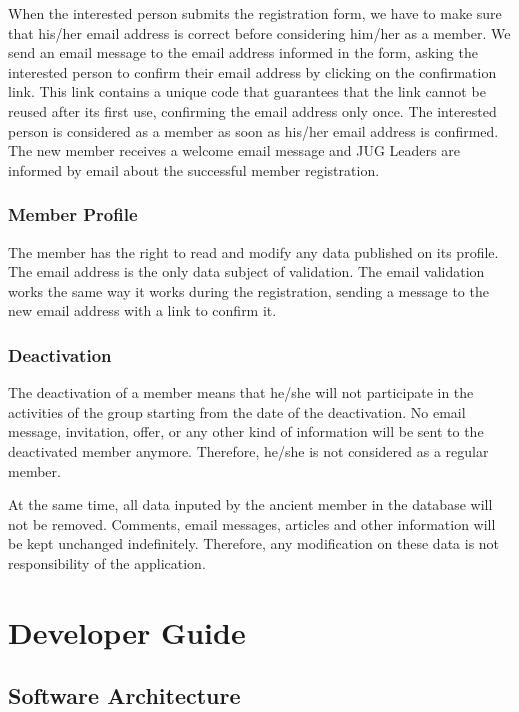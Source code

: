 \documentclass[10pt,a4paper]{report}
\begin{document}
When the interested person submits the registration form, we have to make sure that his/her email address is correct before considering him/her as a member. We send an email message to the email address informed in the form, asking the interested person to confirm their email address by clicking on the confirmation link. This link contains a unique code that guarantees that the link cannot be reused after its first use, confirming the email address only once. The interested person is considered as a member as soon as his/her email address is confirmed. The new member receives a welcome email message and JUG Leaders are informed by email about the successful member registration.

\section{Member Profile}

The member has the right to read and modify any data published on its profile. The email address is the only data subject of validation. The email validation works the same way it works during the registration, sending a message to the new email address with a link to confirm it.

\section{Deactivation}

The deactivation of a member means that he/she will not participate in the activities of the group  starting from the date of the deactivation. No email message, invitation, offer, or any other kind of information will be sent to the deactivated member anymore. Therefore, he/she is not considered as a regular member.

At the same time, all data inputed by the ancient member in the database will not be removed. Comments, email messages, articles and other information will be kept unchanged indefinitely. Therefore, any modification on these data is not responsibility of the application.

\part{Developer Guide}

\chapter{Software Architecture}
\end{document}
